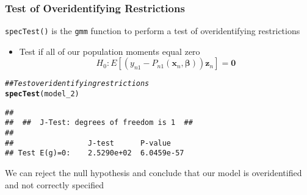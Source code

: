 \documentclass{beamer}\usepackage[]{graphicx}\usepackage[]{color}
\makeatletter
\newcommand{\hlcom}[1]{\textcolor[rgb]{0.678,0.584,0.686}{\textit{#1}}}%
\newcommand{\hlstd}[1]{\textcolor[rgb]{0.345,0.345,0.345}{#1}}%
\newcommand{\hlkwd}[1]{\textcolor[rgb]{0.737,0.353,0.396}{\textbf{#1}}}%
\newenvironment{kframe}{%
 \def\at@end@of@kframe{}%
 \ifinner\ifhmode%
  \def\at@end@of@kframe{\end{minipage}}%
  \begin{minipage}{\columnwidth}%
 \fi\fi%
 \def\FrameCommand##1{\hskip\@totalleftmargin \hskip-\fboxsep
 \colorbox{shadecolor}{##1}\hskip-\fboxsep
     \hskip-\linewidth \hskip-\@totalleftmargin \hskip\columnwidth}%
 \MakeFramed {\advance\hsize-\width
   \@totalleftmargin\z@ \linewidth\hsize
   \@setminipage}}%
 {\par\unskip\endMakeFramed%
 \at@end@of@kframe}
\newenvironment{knitrout}{}{} %
\makeatother
\begin{document}
\begin{frame}[fragile]\frametitle{Test of Overidentifying Restrictions}
  	\texttt{specTest()} is the \texttt{gmm} function to perform a test of overidentifying restrictions
  	\begin{itemize}
  		\item Test if all of our population moments equal zero
  		$$H_0: E[\left( y_{n1} - P_{n1}(\bm{x}_n, \bm{\beta}) \right) \bm{z}_n] = \bm{0}$$
  	\end{itemize}
\begin{knitrout}\footnotesize
{}\color{fgcolor}\begin{kframe}
\begin{alltt}
\hlcom{## Test overidentifying restrictions}
\hlkwd{specTest}\hlstd{(model_2)}
\end{alltt}
\begin{verbatim}
## 
##  ##  J-Test: degrees of freedom is 1  ## 
## 
##                 J-test      P-value   
## Test E(g)=0:    2.5290e+02  6.0459e-57
\end{verbatim}
\end{kframe}
\end{knitrout}
    \vspace{2ex}
    We can reject the null hypothesis and conclude that our model is overidentified and not correctly specified
\end{frame}
\end{document}
